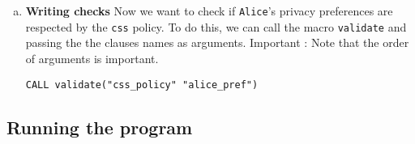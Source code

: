 \begin{enumerate}[a.]
    \item \textbf{Writing checks}
Now we want to check if \texttt{Alice}'s privacy preferences are respected by the \texttt{css} policy.
To do this, we can call the macro \texttt{validate} and passing the the clauses names as arguments.
Important : Note that the order of arguments is important.
\begin{lstlisting}
CALL validate("css_policy" "alice_pref")
\end{lstlisting}

\end{enumerate}


\subsection{Running the program}

